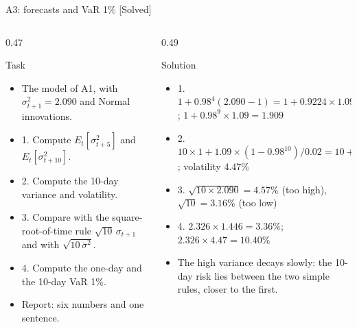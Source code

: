 \begin{frame}{A3: forecasts and VaR 1\% [Solved]}
\itemsize{\scriptsize}
\begin{columns}[T]
\begin{column}{0.47\textwidth}
\begin{block}{Task}
\begin{itemize}
    \item The model of A1, with $\sigma_{t+1}^2 = 2.090$ and Normal innovations.
    \item 1. Compute $E_t[\sigma_{t+5}^2]$ and $E_t[\sigma_{t+10}^2]$.
    \item 2. Compute the 10-day variance and volatility.
    \item 3. Compare with the square-root-of-time rule $\sqrt{10}\,\sigma_{t+1}$ and with $\sqrt{10\,\bar\sigma^2}$.
    \item 4. Compute the one-day and the 10-day VaR 1\%.
    \item Report: six numbers and one sentence.
\end{itemize}
\end{block}
\end{column}
\begin{column}{0.49\textwidth}
\begin{exampleblock}{Solution}
\begin{itemize}
    \item 1. $1 + 0.98^{4}(2.090 - 1) = 1 + 0.9224 \times 1.09 = 2.005$; $1 + 0.98^{9} \times 1.09 = 1.909$
    \item 2. $10 \times 1 + 1.09 \times (1 - 0.98^{10})/0.02 = 10 + 1.09 \times 9.146 = 19.97$; volatility $4.47\%$
    \item 3. $\sqrt{10 \times 2.090} = 4.57\%$ (too high), $\sqrt{10} = 3.16\%$ (too low)
    \item 4. $2.326 \times 1.446 = 3.36\%$; $2.326 \times 4.47 = 10.40\%$
    \item The high variance decays slowly: the 10-day risk lies between the two simple rules, closer to the first.
\end{itemize}
\end{exampleblock}
\end{column}
\end{columns}
\end{frame}


